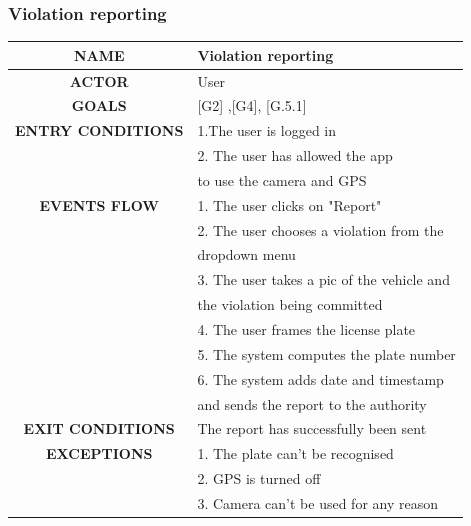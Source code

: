 \documentclass[12pt,a4paper]{article}
\begin{document}
\subsubsection{Violation reporting}
		\begin{center}
			\begin{tabular}{| c | l |}
				\hline
				\textbf{NAME} & Violation reporting \\
				\hline
				\textbf{ACTOR} & User \\
				\hline
				\textbf{GOALS} & [G2] ,[G4], [G.5.1] \\
				\hline
				\textbf{ENTRY CONDITIONS} &1.The user is logged in \\
				&2. The user has allowed the app \\
				&to use the camera and GPS \\ \hline
				\textbf{EVENTS FLOW}  &
				1. The user clicks on "Report"\\
				&2. The user chooses a violation from the \\
				& dropdown menu \\
				&3. The user takes a pic of the vehicle and \\
				& the violation being committed \\ \hline
				&4. The user frames the license plate\\
				&5. The system computes the plate number \\
				&6. The system adds date and timestamp \\
				& and sends the report to the authority \\ 
				\hline
				\textbf{EXIT CONDITIONS}  & The report has successfully been sent \\ \hline
				\textbf{EXCEPTIONS} &
				1. The plate can't be recognised \\
				&2. GPS is turned off\\
				&3. Camera can't be used for any reason\\
				\hline
			\end{tabular}
		\end{center}
\end{document}
